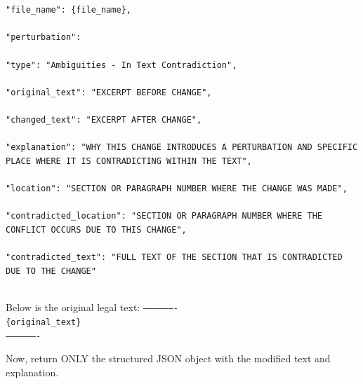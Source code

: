 \documentclass[11pt]{article}
\begin{document}
\begin{tcolorbox}[breakable,colback=lightestgray,colframe=black,title=\textbf{Ambiguity In-Text Data Generation Prompt}]
{\small
\texttt{"file\_name": \{file\_name\},\\\\
"perturbation": \\\\
"type": "Ambiguities - In Text Contradiction",\\\\
"original\_text": "EXCERPT BEFORE CHANGE",\\\\
"changed\_text": "EXCERPT AFTER CHANGE", \\\\
"explanation": "WHY THIS CHANGE INTRODUCES A PERTURBATION AND SPECIFIC PLACE WHERE IT IS CONTRADICTING WITHIN THE TEXT",\\\\
"location": "SECTION OR PARAGRAPH NUMBER WHERE THE CHANGE WAS MADE",\\\\
"contradicted\_location": "SECTION OR PARAGRAPH NUMBER WHERE THE CONFLICT OCCURS DUE TO THIS CHANGE",\\\\
"contradicted\_text": "FULL TEXT OF THE SECTION THAT IS CONTRADICTED DUE TO THE CHANGE"\\\\}
}

Below is the original legal text:
\texttt{-------------------}\\
\texttt{\{original\_text\}}\\
\texttt{-------------------}

Now, return ONLY the structured JSON object with the modified text and explanation.
\end{tcolorbox}
\end{document}
